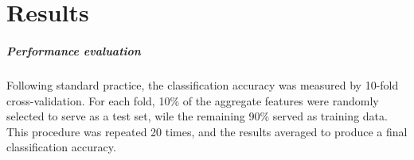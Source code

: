 








\chapter{Results} \label{chap:results}

\paragraph{Performance evaluation}
Following standard practice, the classification accuracy was measured by 10-fold cross-validation. For each fold, 10\% of the aggregate features were randomly selected to serve as a test set, wile the remaining 90\% served as training data. This procedure was repeated 20 times, and the results averaged to produce a final classification accuracy.

